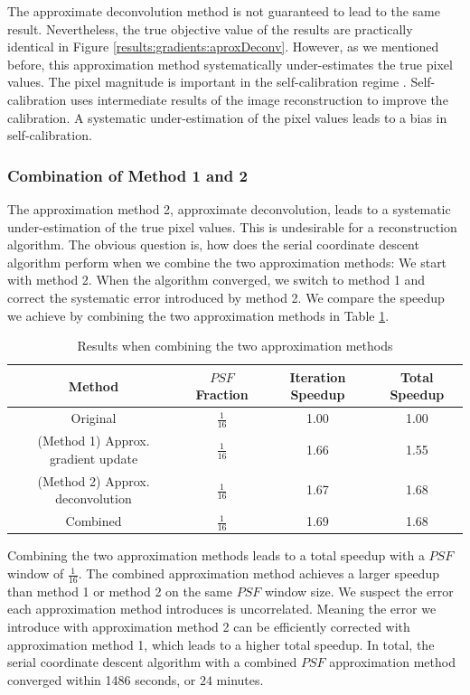 The approximate deconvolution method is not guaranteed to lead to the same result. Nevertheless, the true objective value of the results are practically identical in Figure \ref{results:gradients:aproxDeconv}. However, as we mentioned before, this approximation method systematically under-estimates the true pixel values. The pixel magnitude is important in the self-calibration regime \cite{offringa2017optimized}. Self-calibration uses intermediate results of the image reconstruction to improve the calibration. A systematic under-estimation of the pixel values leads to a bias in self-calibration.


\subsubsection{Combination of Method 1 and 2}\label{results:gradients:comparison}
The approximation method 2, approximate deconvolution, leads to a systematic under-estimation of the true pixel values. This is undesirable for a reconstruction algorithm. The obvious question is, how does the serial coordinate descent algorithm perform when we combine the two approximation methods: We start with method 2. When the algorithm converged, we switch to method 1 and correct the systematic error introduced by method 2. We compare the speedup we achieve by combining the two approximation methods in Table \ref{results:gradients:comparison:speedup}.


\begin{table}[h]
	\centering
	\begin{tabular}{ c | c ||c|c } 
		\hline
		Method & $PSF$ Fraction & Iteration Speedup & Total Speedup \\ \hline \hline
		Original & $\frac{1}{16}$ & 1.00 & 1.00 \\ 
		(Method 1) Approx. gradient update & $\frac{1}{16}$ & 1.66 & 1.55 \\ 
		(Method 2) Approx. deconvolution & $\frac{1}{16}$ & 1.67 & 1.68 \\ \hline
		Combined & $\frac{1}{16}$ & 1.69 & 1.68 \\ 
		\hline
	\end{tabular}

	\caption{Results when combining the two approximation methods}
	\label{results:gradients:comparison:speedup}
	
\end{table}

Combining the two approximation methods leads to a total speedup with a $PSF$ window of $\frac{1}{16}$. The combined approximation method achieves a larger speedup than method 1 or method 2 on the same $PSF$ window size. We suspect the error each approximation method introduces is uncorrelated. Meaning the error we introduce with approximation method 2 can be efficiently corrected with approximation method 1, which leads to a higher total speedup. In total, the serial coordinate descent algorithm with a combined $PSF$ approximation method converged within 1486 seconds, or $24$ minutes.

